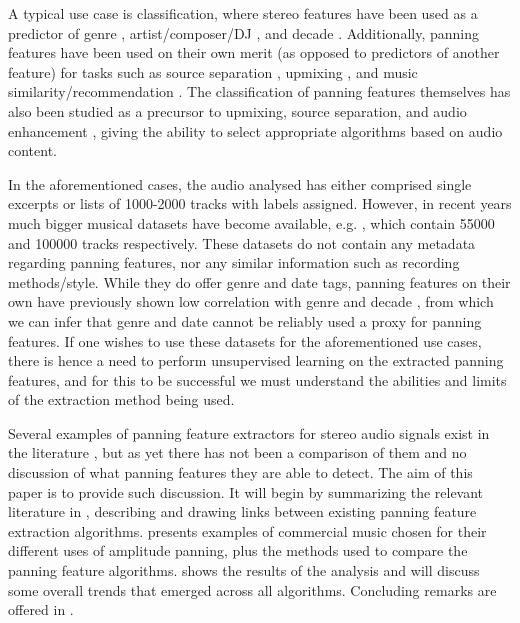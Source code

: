 \documentclass[twoside,a4paper]{article}
\begin{document}
A typical use case is classification, where stereo features have been used as a predictor of genre \cite{tzanetakisStereoPanningFeatures2007,tzanetakisStereoPanningInformation2010,ziemerGoniometersArePowerful2023}, artist/composer/DJ \cite{tzanetakisStereoPanningInformation2010,ziemerAcousticFeaturesRecording2021}, and decade \cite{tardieuProductionEffectAudio2011}. Additionally, panning features have been used on their own merit (as opposed to predictors of another feature) for tasks such as source separation \cite{barrySoundSourceSeparation2004,shim2009Stereo}, upmixing \cite{avendano2002frequency}, and music similarity/recommendation \cite{gomezMusicSimilaritySystems2008,ziemerAcousticFeaturesRecording2021}. The classification of panning features themselves has also been studied as a precursor to upmixing, source separation, and audio enhancement \cite{harmaStereoAudioClassification2011,harmaClassificationTimefrequencyRegions2011}, giving the ability to select appropriate algorithms based on audio content.

In the aforementioned cases, the audio analysed has either comprised single excerpts or lists of 1000-2000 tracks with labels assigned. However, in recent years much bigger musical datasets have become available, e.g. \cite{bogdanovMTGJamendoDatasetAutomatic2019,fma_dataset}, which contain 55000 and 100000 tracks respectively. These datasets do not contain any metadata regarding panning features, nor any similar information such as recording methods/style. While they do offer genre and date tags, panning features on their own have previously shown low correlation with genre and decade \cite{tzanetakisStereoPanningInformation2010,tardieuProductionEffectAudio2011}, from which we can infer that genre and date cannot be reliably used a proxy for panning features. If one wishes to use these datasets for the aforementioned use cases, there is hence a need to perform unsupervised learning on the extracted panning features, and for this to be successful we must understand the abilities and limits of the extraction method being used. 

Several examples of panning feature extractors for stereo audio signals exist in the literature \cite{tzanetakisStereoPanningFeatures2007,sarroffMeasurementsSpaciousnessStereophonic2008,gomezMusicSimilaritySystems2008,tardieuProductionEffectAudio2011}, but as yet there has not been a comparison of them and no discussion of what panning features they are able to detect. The aim of this paper is to provide such discussion. It will begin by summarizing the relevant literature in , describing and drawing links between existing panning feature extraction algorithms.  presents examples of commercial music chosen for their different uses of amplitude panning, plus the methods used to compare the panning feature algorithms.  shows the results of the analysis and  will discuss some overall trends that emerged across all algorithms. Concluding remarks are offered in .
\end{document}

